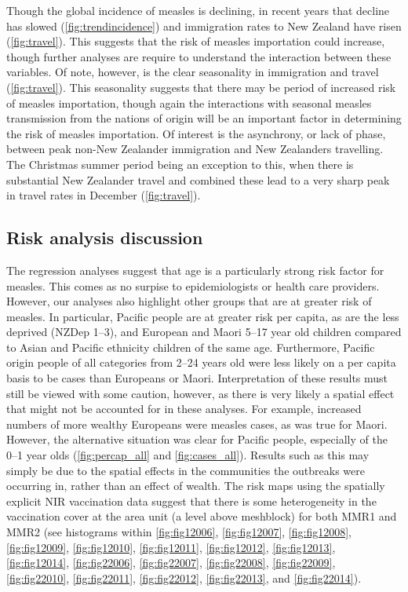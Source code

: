 \documentclass{article}
\begin{document}
Though the global incidence of measles is declining, in recent years that decline has slowed (\autoref{fig:trendincidence}) and immigration rates to New Zealand have risen (\autoref{fig:travel}). This suggests that the risk of measles importation could increase, though further analyses are require to understand the interaction between these variables.  Of note, however, is the clear seasonality in immigration and travel (\autoref{fig:travel}).  This seasonality suggests that there may be period of increased risk of measles importation, though again the interactions with seasonal measles transmission from the nations of origin will be an important factor in determining the risk of measles importation. Of interest is the asynchrony, or lack of phase, between peak non-New Zealander immigration and New Zealanders travelling. The Christmas summer period being an exception to this, when there is substantial New Zealander travel and combined these lead to a very sharp peak in travel rates in December (\autoref{fig:travel}).

\subsection*{Risk analysis discussion}

The regression analyses suggest that age is a particularly strong risk factor for measles. This comes as no surpise to epidemiologists or health care providers. However, our analyses also highlight other groups that are at greater risk of measles. In particular, Pacific people are at greater risk per capita, as are the less deprived (NZDep 1--3), and European and Maori 5--17 year old children compared to Asian and Pacific ethnicity children of the same age. Furthermore, Pacific origin people of all categories from 2--24 years old were less likely on a per capita basis to be cases than Europeans or Maori. Interpretation of these results must still be viewed with some caution, however, as there is very likely a spatial effect that might not be accounted for in these analyses. For example, increased numbers of more wealthy Europeans were measles cases, as was true for Maori. However, the alternative situation was clear for Pacific people, especially of the 0--1 year olds (\autoref{fig:percap_all} and \autoref{fig:cases_all}). Results such as this may simply be due to the spatial effects in the communities the outbreaks were occurring in, rather than an effect of wealth. The risk maps using the spatially explicit NIR vaccination data suggest that there is some heterogeneity in the vaccination cover at the area unit (a level above meshblock) for both MMR1 and MMR2 (see histograms within \autoref{fig:fig12006}, \autoref{fig:fig12007}, \autoref{fig:fig12008}, \autoref{fig:fig12009}, \autoref{fig:fig12010}, \autoref{fig:fig12011}, \autoref{fig:fig12012}, \autoref{fig:fig12013}, \autoref{fig:fig12014}, \autoref{fig:fig22006}, \autoref{fig:fig22007}, \autoref{fig:fig22008}, \autoref{fig:fig22009}, \autoref{fig:fig22010}, \autoref{fig:fig22011}, \autoref{fig:fig22012}, \autoref{fig:fig22013}, and \autoref{fig:fig22014}).
\end{document}
